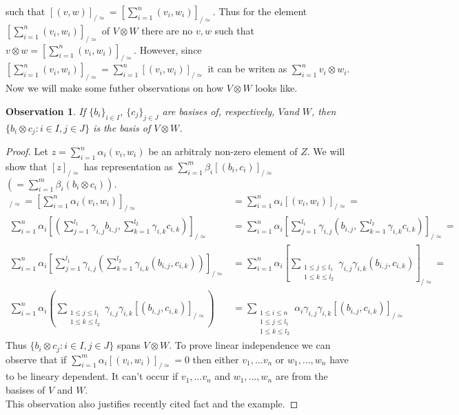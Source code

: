 \documentclass[a4paper]{article}
\newtheorem{observation}{Observation}
\begin{document}
such that $ [(v,w)]_{/\simeq} = \left[\displaystyle\sum^n_{i=1}(v_i,w_i)\right]_{/\simeq}$.
Thus for the element $\left[\displaystyle\sum^n_{i=1}(v_i,w_i)\right]_{/\simeq}$ of $V\otimes W$
there are no $v, w$ such that $v \otimes w = \left[\displaystyle\sum^n_{i=1}(v_i,w_i)\right]_{/\simeq}$.
However, since $\left[\displaystyle\sum^n_{i=1}(v_i,w_i)\right]_{/\simeq} =
\displaystyle\sum^n_{i=1}[(v_i,w_i)]_{/\simeq}$ it can be writen as
$\displaystyle\sum^n_{i=1}v_i \otimes w_i$. \\
Now we will make some futher observations on how $V \otimes W$ looks like.
\begin{observation}
\label{observation:1}
If $\{b_i\}_{i \in I}$, $\{c_j\}_{j \in J}$ are basises of, respectively, $V$and $W$,
then $\{b_i \otimes c_j : i \in I, j \in J\}$ is the basis of $V \otimes W$.
\end{observation}
\begin{proof}
Let $z = \displaystyle\sum^n_{i = 1}\alpha_i(v_i,w_i)$ be an arbitraly non-zero element of $Z$. We will show
that $[z]_{/\simeq}$ has representation as $\displaystyle\sum^m_{i = 1}\beta_i [(b_i,c_i)]_{/\simeq}$
$\left(=\displaystyle\sum^m_{i = 1}\beta_i(b_i \otimes c_i)\right)$.
\begin{align*}
[z]_{/\simeq} = \left[\sum^n_{i = 1}\alpha_i(v_i,w_i)\right]_{/\simeq} &=
\sum^n_{i = 1}\alpha_i[(v_i,w_i)]_{/\simeq} = \\
\sum^n_{i = 1}\alpha_i\left[\left(\sum^{l_1}_{j=1}\gamma_{i,j}b_{i,j},
\sum^{l_2}_{k=1}\gamma_{i,k}c_{i,k}\right)\right]_{/\simeq} &=
\sum^n_{i = 1}\alpha_i\left[\sum^{l_1}_{j=1}\gamma_{i,j}\left(b_{i,j},
\sum^{l_2}_{k=1}\gamma_{i,k}c_{i,k}\right)\right]_{/\simeq} = \\
\sum^n_{i = 1}\alpha_i\left[\sum^{l_1}_{j=1}\gamma_{i,j}\left(\sum^{l_2}_{k=1}\gamma_{i,k}
\left(b_{i,j},c_{i,k}\right)\right)\right]_{/\simeq} &=
\sum^n_{i = 1}\alpha_i\left[\sum_{\substack{1 \leq j \leq l_1 \\ 1 \leq k \leq l_2}}
\gamma_{i,j}\gamma_{i,k}(b_{i,j}, c_{i,k})\right]_{/\simeq} = \\
\sum^n_{i = 1}\alpha_i\left(\sum_{\substack{1 \leq j \leq l_1 \\ 1 \leq k \leq l_2}}
\gamma_{i,j}\gamma_{i,k}[(b_{i,j}, c_{i,k})]_{/\simeq}\right) &=
\sum_{\substack{1 \leq i \leq n \\1 \leq j \leq l_1 \\ 1 \leq k \leq l_2}}
\alpha_i\gamma_{i,j}\gamma_{i,k}[(b_{i,j}, c_{i,k})]_{/\simeq}
\end{align*}
Thus $\{b_i \otimes c_j : i \in I, j \in J\}$ spans $V \otimes W$. To prove linear independence we can observe
that if $\displaystyle\sum^m_{i = 1}\alpha_i [(v_i,w_i)]_{/\simeq} = 0$
then either $v_1, \dots v_n$ or $w_1, \dots, w_n$ have to be lineary dependent. It can't occur if
$v_1, \dots v_n$ and $w_1, \dots, w_n$ are from the basises of $V$ and $W$.\\
This observation also justifies
recently cited fact and the example.
\end{proof}
\end{document}
